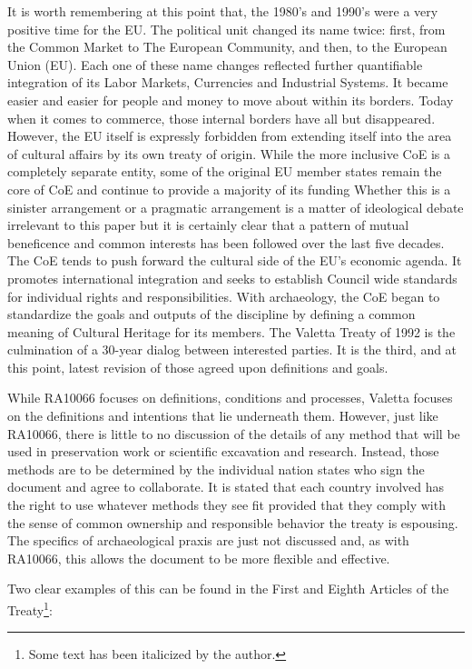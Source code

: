\documentclass[spanish]{ijsra}
\begin{document}
It is worth remembering at this point that, the 1980’s and 1990’s were a very positive time for the EU. The political unit changed its name twice: first, from the Common Market to The European Community, and then, to the European Union (EU). Each one of these name changes reflected further quantifiable integration of its Labor Markets, Currencies and Industrial Systems. It became easier and easier for people and money to move about within its borders. Today when it comes to commerce, those internal borders have all but disappeared. However, the EU itself is expressly forbidden from extending itself into the area of cultural affairs by its own treaty of origin. While the more inclusive CoE is a completely separate entity, some of the original EU member states remain the core of CoE and continue to provide a majority of its funding %
Whether this is a sinister arrangement or a pragmatic arrangement is a matter of ideological debate irrelevant to this paper but it is certainly clear that a pattern of mutual beneficence and common interests has been followed over the last five decades. The CoE tends to push forward the cultural side of the EU’s economic agenda. It promotes international integration and seeks to establish Council wide standards for individual rights and responsibilities. With archaeology, the CoE began to standardize the goals and outputs of the discipline by defining a common meaning of Cultural Heritage for its members. The Valetta Treaty of 1992 is the culmination of a 30-year dialog between interested parties. It is the third, and at this point, latest revision of those agreed upon definitions and goals. 

While RA10066 focuses on definitions, conditions and processes, Valetta focuses on the definitions and intentions that lie underneath them. However, just like RA10066, there is little to no discussion of the details of any method that will be used in preservation work or scientific excavation and research. Instead, those methods are to be determined by the individual nation states who sign the document and agree to collaborate. It is stated that each country involved has the right to use whatever methods they see fit provided that they comply with the sense of common ownership and responsible behavior the treaty is espousing. The specifics of archaeological praxis are just not discussed and, as with RA10066, this allows the document to be more flexible and effective. 

Two clear examples of this can be found in the First and Eighth Articles of the Treaty\footnote{Some text has been italicized by the author.}:
\end{document}
